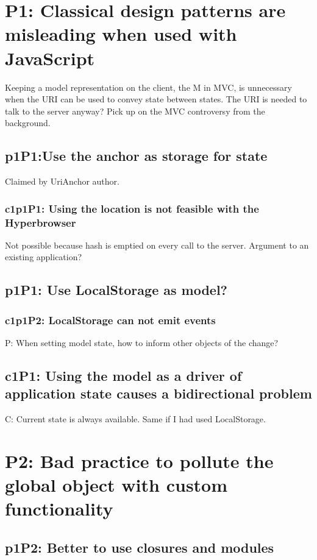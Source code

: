 \documentclass[english]{ifimaster}
\begin{document}
\section{P1: Classical design patterns are misleading when used with JavaScript}
Keeping a model representation on the client, the M in MVC, is unnecessary when the URI can be used to convey state between states. The URI is needed to talk to the server anyway?  Pick up on the MVC controversy from the background.
\subsection{p1P1:Use the anchor as storage for state}
Claimed by UriAnchor author.

\subsubsection{c1p1P1: Using the location is not feasible with the Hyperbrowser}
Not possible because hash is emptied on every call to the server. Argument to an existing application?
\subsection{p1P1: Use LocalStorage as model?}

\subsubsection{c1p1P2: LocalStorage can not emit events}
P: When setting model state, how to inform other objects of the change?

\subsection{c1P1: Using the model as a driver of application state causes a bidirectional problem}

C: Current state is always available. Same if I had used LocalStorage.
\section{P2: Bad practice to pollute the global object with custom functionality}
\subsection{p1P2: Better to use closures and modules}
\end{document}
